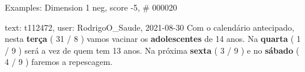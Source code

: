\begin{frame}{Examples: Dimension 1 neg, score -5, \# 000020}
\footnotesize
\begin{alertblock}{text: t112472, user: RodrigoO\_Saude, 2021-08-30}
Com o calendário antecipado, nesta \textbf{terça} ( 31 / 8 ) vamos vacinar os 
\textbf{adolescentes} de 14 anos. Na \textbf{quarta} ( 1 / 9 ) será a vez de 
quem tem 13 anos. Na próxima \textbf{sexta} ( 3 / 9 ) e no \textbf{sábado} ( 4 
/ 9 ) faremos a repescagem. 
\end{alertblock}
\end{frame}
